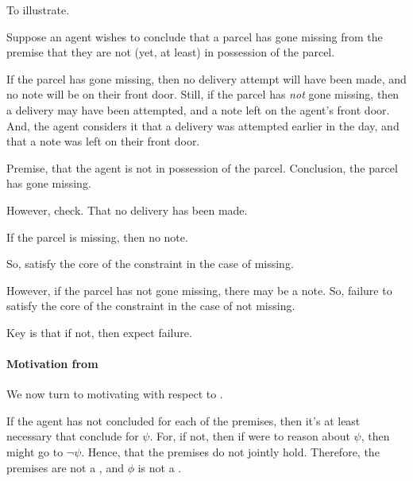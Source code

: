 \begin{note}[Illustration]
  To illustrate.

  \begin{illustration}
    Suppose an agent wishes to conclude that a parcel has gone missing from the premise that they are not (yet, at least) in possession of the parcel.

    If the parcel has gone missing, then no delivery attempt will have been made, and no note will be on their front door.
    Still, if the parcel has \emph{not} gone missing, then a delivery may have been attempted, and a note left on the agent's front door.
    And, the agent considers it \epVAd{} that a delivery was attempted earlier in the day, and that a note was left on their front door.
  \end{illustration}

  Premise, that the agent is not in possession of the parcel.
  Conclusion, the parcel has gone missing.

  However, check.
  That no delivery has been made.

  If the parcel is missing, then no note.

  So, satisfy the core of the constraint in the case of missing.

  However, if the parcel has not gone missing, there may be a note.
  So, failure to satisfy the core of the constraint in the case of not missing.
\end{note}

\begin{note}
  Key is that if not, then expect failure.
\end{note}

\paragraph{Motivation from \support{}}

\begin{note}
  We now turn to motivating \ideaCS{} with respect to .
\end{note}

\begin{note}
  If the agent has not concluded for each of the premises, then it's at least necessary that conclude for \(\psi\).
  For, if not, then if were to reason about \(\psi\), then might go to \(\lnot\psi\).
  Hence, that the premises do not jointly hold.
  Therefore, the premises are not a \sink{}, and \(\phi\) is not a \sink{}.
\end{note}

